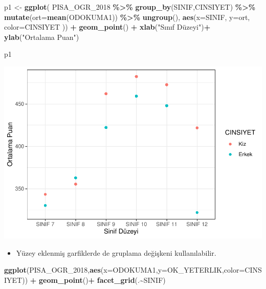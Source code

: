 \documentclass[
  oneside]{book}
\newenvironment{Shaded}{\begin{snugshade}}{\end{snugshade}}
\newcommand{\AttributeTok}[1]{\textcolor[rgb]{0.13,0.29,0.53}{#1}}
\newcommand{\FunctionTok}[1]{\textcolor[rgb]{0.13,0.29,0.53}{\textbf{#1}}}
\newcommand{\NormalTok}[1]{#1}
\newcommand{\OtherTok}[1]{\textcolor[rgb]{0.56,0.35,0.01}{#1}}
\newcommand{\SpecialCharTok}[1]{\textcolor[rgb]{0.81,0.36,0.00}{\textbf{#1}}}
\newcommand{\StringTok}[1]{\textcolor[rgb]{0.31,0.60,0.02}{#1}}
\providecommand{\tightlist}{%
  \setlength{\itemsep}{0pt}\setlength{\parskip}{0pt}}
\begin{document}
\begin{Shaded}
\begin{Highlighting}[]
\NormalTok{p1 }\OtherTok{\textless{}{-}} \FunctionTok{ggplot}\NormalTok{(}
\NormalTok{      PISA\_OGR\_2018 }\SpecialCharTok{\%\textgreater{}\%} 
      \FunctionTok{group\_by}\NormalTok{(SINIF,CINSIYET) }\SpecialCharTok{\%\textgreater{}\%}
      \FunctionTok{mutate}\NormalTok{(}\AttributeTok{ort=}\FunctionTok{mean}\NormalTok{(ODOKUMA1)) }\SpecialCharTok{\%\textgreater{}\%} \FunctionTok{ungroup}\NormalTok{(),}
     \FunctionTok{aes}\NormalTok{(}\AttributeTok{x=}\NormalTok{SINIF, }\AttributeTok{y=}\NormalTok{ort, }\AttributeTok{color=}\NormalTok{CINSIYET )) }\SpecialCharTok{+}
  \FunctionTok{geom\_point}\NormalTok{() }\SpecialCharTok{+}  
  \FunctionTok{xlab}\NormalTok{(}\StringTok{"Sınıf Düzeyi"}\NormalTok{)}\SpecialCharTok{+}
  \FunctionTok{ylab}\NormalTok{(}\StringTok{"Ortalama Puan"}\NormalTok{) }

\NormalTok{p1}
\end{Highlighting}
\end{Shaded}

\begin{center}\includegraphics[width=1\linewidth]{15-betimleyici-istatistik_files/figure-latex/unnamed-chunk-36-1} \end{center}

\begin{itemize}
\tightlist
\item
  Yüzey eklenmiş garfiklerde de gruplama değişkeni kullanılabilir.
\end{itemize}

\begin{Shaded}
\begin{Highlighting}[]
\FunctionTok{ggplot}\NormalTok{(PISA\_OGR\_2018,}\FunctionTok{aes}\NormalTok{(}\AttributeTok{x=}\NormalTok{ODOKUMA1,}\AttributeTok{y=}\NormalTok{OK\_YETERLIK,}\AttributeTok{color=}\NormalTok{CINSIYET)) }\SpecialCharTok{+}
  \FunctionTok{geom\_point}\NormalTok{()}\SpecialCharTok{+}
  \FunctionTok{facet\_grid}\NormalTok{(.}\SpecialCharTok{\textasciitilde{}}\NormalTok{SINIF)   }
\end{Highlighting}
\end{Shaded}
\end{document}
